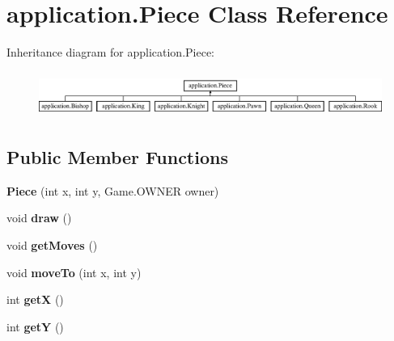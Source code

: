 \hypertarget{classapplication_1_1_piece}{\section{application.\+Piece Class Reference}
\label{classapplication_1_1_piece}
}
Inheritance diagram for application.\+Piece\+:\begin{figure}[H]
\begin{center}
\leavevmode
\includegraphics[height=1.517615cm]{classapplication_1_1_piece}
\end{center}
\end{figure}
\subsection*{Public Member Functions}
\begin{DoxyCompactItemize}
\item 
\hypertarget{classapplication_1_1_piece_a7845605267af2d616efc66af07d175ea}{{\bfseries Piece} (int x, int y, Game.\+O\+W\+N\+E\+R owner)}\label{classapplication_1_1_piece_a7845605267af2d616efc66af07d175ea}

\item 
\hypertarget{classapplication_1_1_piece_ae4bdd8cfc85f889c8d7dc840a137cd65}{void {\bfseries draw} ()}\label{classapplication_1_1_piece_ae4bdd8cfc85f889c8d7dc840a137cd65}

\item 
\hypertarget{classapplication_1_1_piece_acca039f617b0bf259eb1e1d00fbf4cda}{void {\bfseries get\+Moves} ()}\label{classapplication_1_1_piece_acca039f617b0bf259eb1e1d00fbf4cda}

\item 
\hypertarget{classapplication_1_1_piece_ac91b28148a2b0e38edeba7a42501d99f}{void {\bfseries move\+To} (int x, int y)}\label{classapplication_1_1_piece_ac91b28148a2b0e38edeba7a42501d99f}

\item 
\hypertarget{classapplication_1_1_piece_a2e58a2e63e94dd3de909e2fd55a7b819}{int {\bfseries get\+X} ()}\label{classapplication_1_1_piece_a2e58a2e63e94dd3de909e2fd55a7b819}

\item 
\hypertarget{classapplication_1_1_piece_a360e6e106c1254e4b86e69143ca0ce72}{int {\bfseries get\+Y} ()}\label{classapplication_1_1_piece_a360e6e106c1254e4b86e69143ca0ce72}

\end{DoxyCompactItemize}

